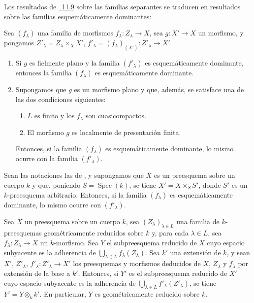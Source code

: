 Los resultados de {\hyperlink{ega4.c04.subsec.11-9}{\textsection~11.9}} sobre las familias separantes se traducen en resultados sobre las familias esquemáticamente dominantes:

\begin{theorem}[11.10.5]
\label{IV.11.10.5}
Sea $(f_\lambda)$ una familia de morfismos $f_\lambda:Z_\lambda\to X$, sea $g:X'\to X$ un morfismo, y pongamos $Z'_\lambda=Z_\lambda\times_XX'$, $f'_\lambda=(f_\lambda)_{(X')}:Z'_\lambda\to X'$.
\begin{enumerate}[label=\textup{(\roman*)}]
  \item Si $g$ es fielmente plano y la familia $(f'_\lambda)$ es esquemáticamente dominante, entonces la familia $(f_\lambda)$ es esquemáticamente dominante.
  \item Supongamos que $g$ es un morfismo plano y que, además, se satisface \textup{una} de las dos condiciones siguientes:
  \begin{enumerate}[label=\emph{\alph*)}]
    \item $L$ es finito y los $f_\lambda$ son cuasicompactos.
    \item El morfismo $g$ es localmente de presentación finita.
  \end{enumerate}
  Entonces, si la familia $(f_\lambda)$ es esquemáticamente dominante, lo mismo ocurre con la familia $(f'_\lambda)$.
\end{enumerate}
\end{theorem}

\begin{proposition}[11.10.6]
\label{IV.11.10.6}
Sean las notaciones las de , y supongamos que $X$ es un preesquema sobre un cuerpo $k$ y que, poniendo $S=\operatorname{Spec}(k)$, se tiene $X'=X\times_SS'$, donde $S'$ es un $k$-preesquema arbitrario.
Entonces, si la familia $(f_\lambda)$ es esquemáticamente dominante, lo mismo ocurre con $(f'_\lambda)$.
\end{proposition}

\begin{corollary}[11.10.7]
\label{IV.11.10.7}
Sea $X$ un preesquema sobre un cuerpo $k$, sea $(Z_\lambda)_{\lambda\in L}$ una familia de $k$-preesquemas geométricamente reducidos sobre $k$ y, para cada $\lambda\in L$, sea $f_\lambda:Z_\lambda\to X$ un $k$-morfismo.
Sea $Y$ el subpreesquema reducido de $X$ cuyo espacio subyacente es la adherencia de $\bigcup_{\lambda\in L}f_\lambda(Z_\lambda)$.
Sea $k'$ una extensión de $k$, y sean $X'$, $Z'_\lambda$, $f'_\lambda:Z'_\lambda\to X'$ los preesquemas y morfismos deducidos de $X$, $Z_\lambda$ y $f_\lambda$ por extensión de la base a $k'$.
Entonces, si $Y'$ es el subpreesquema reducido de $X'$ cuyo espacio subyacente es la adherencia de $\bigcup_{\lambda\in L}f'_\lambda(Z'_\lambda)$, se tiene $Y'=Y\otimes_k k'$.
En particular, $Y$ es geométricamente reducido sobre $k$.
\end{corollary}

